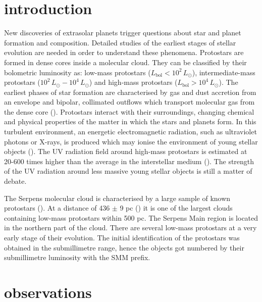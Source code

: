 \documentclass[a4paper]{article}
\begin{document}
\section*{\sc introduction}
\indent \indent New discoveries of extrasolar planets trigger questions about star and planet formation and composition. Detailed studies of the earliest stages of stellar evolution are needed in order to understand these phenomena. Protostars are formed in dense cores inside a molecular cloud. They can be classified by their bolometric luminosity as: low-mass protostars ($L_{\mathrm{bol}} < 10^2 \, L{_\odot}$), intermediate-mass protostars ($10^2 \, L{_\odot} - 10^4 \, L{_\odot}$) and high-mass protostars ($L_{\mathrm{bol}} > 10^4 \, L{_\odot}$). The earliest phases of star formation are characterised by gas and dust accretion from an envelope and bipolar, collimated outflows which transport molecular gas from the dense core (\cite{arce2006}). Protostars interact with their surroundings, changing chemical and physical properties of the matter in which the stars and planets form. In this turbulent environment, an energetic electromagnetic radiation, such as ultraviolet photons or X-rays, is produced which may ionise the environment of young stellar objects (\cite{stauber2007}). The UV radiation field around high-mass protostars is estimated at 20-600 times higher than the average in the interstellar medium (\cite{benz2016}). The strength of the UV radiation around less massive young stellar objects is still a matter of debate. 

\indent \indent The Serpens molecular cloud is characterised by a large sample of known protostars (\cite{evans2009}). At a distance of 436 $\pm$ 9 pc (\cite{ortiz2017}) it is one of the largest clouds containing low-mass protostars within 500 pc. The Serpens Main region is located in the northern part of the cloud. There are several low-mass protostars at a very early stage of their evolution. The initial identification of the protostars was obtained in the submillimetre range, hence the objects got numbered by their submillimetre luminosity with the SMM prefix. 

\section*{\sc observations}
\end{document}
